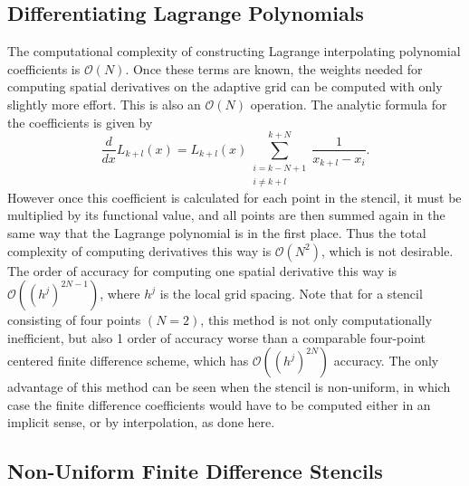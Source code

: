 \documentclass[11pt]{article}
\begin{document}
\subsection{Differentiating Lagrange Polynomials} 
The computational complexity of constructing Lagrange interpolating polynomial coefficients is $\mathcal{O}(N)$. 
Once these terms are known, the weights needed for computing spatial derivatives on the adaptive grid can be computed with only slightly more effort. This is also an $\mathcal{O}(N)$ operation. 
The analytic formula for the coefficients is given by
\begin{equation}
    \frac{d}{dx} L_{k+l}(x) = L_{k+l}(x) \sum_{ \substack{ i=k-N+1 \\ i\neq k+l } }^{k+N} \frac{1}{x_{k+l}-x_i}.
\end{equation}
However once this coefficient is calculated for each point in the stencil, it must be multiplied by its functional value, 
and all points are then summed again in the same way that the Lagrange polynomial is in the first place. 
Thus the total complexity of computing derivatives this way is $\mathcal{O}(N^2)$, which is not desirable. The order of 
accuracy for computing one spatial derivative this way is $\mathcal{O}((h^j)^{2N-1})$, where $h^j$ is the local grid spacing. 
Note that for a stencil consisting of four points $(N=2)$, this method is not only computationally inefficient, but also 1 order 
of accuracy worse than a comparable four-point centered finite difference scheme, which has $\mathcal{O}((h^j)^{2N})$
accuracy. The only advantage of this method can be seen when the stencil is non-uniform, in which case the finite difference 
coefficients would have to be computed either in an implicit sense, or by interpolation, as done here.
\subsection{Non-Uniform Finite Difference Stencils}
\end{document}
